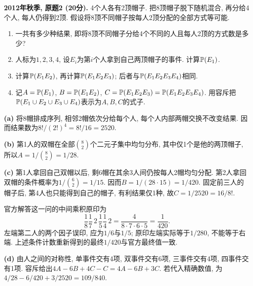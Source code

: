 \begin{exercise}\label{ex:m1-2012f-q2}
\textbf{2012年秋季, 原题2 (20分).} 4个人各有2顶帽子. 把8顶帽子脱下随机混合, 再分给4个人, 每人仍得到2顶. 假设将8顶不同帽子按每人2顶分配的全部方式等可能.
\begin{enumerate}
\item[(a)]\label{ex:m1-2012f-q2-a} 一共有多少种结果, 即将8顶不同帽子分给4个不同的人且每人2顶的方式数是多少?
\item[(b)]\label{ex:m1-2012f-q2-b} 人标为$1,2,3,4$, 设$E_i$为第$i$个人拿到自己两顶帽子的事件. 计算$\mathbb P(E_1)$.
\item[(c)]\label{ex:m1-2012f-q2-c} 计算$\mathbb P(E_1E_2)$, 再计算$\mathbb P(E_1E_2E_3)$; 后者与$\mathbb P(E_1E_2E_3E_4)$相同.
\item[(d)]\label{ex:m1-2012f-q2-d} 记$A=\mathbb P(E_1)$, $B=\mathbb P(E_1E_2)$, $C=\mathbb P(E_1E_2E_3)=\mathbb P(E_1E_2E_3E_4)$. 用容斥把$\mathbb P(E_1\cup E_2\cup E_3\cup E_4)$表示为$A,B,C$的式子.
\end{enumerate}
\end{exercise}
\begin{solution}
\textbf{(a)}\label{sol:m1-2012f-q2-a} 将8帽排成序列, 相邻2帽依次分给每个人, 每个人内部两帽交换不改变结果. 因而结果数为$8!/(2!)^4=8!/16=2520$.

\textbf{(b)}\label{sol:m1-2012f-q2-b} 第1人的双帽在全部$\binom82$个二元子集中均匀分布, 其中仅1个是他的两顶帽子, 所以$A=1/\binom82=1/28$.

\textbf{(c)}\label{sol:m1-2012f-q2-c} 第1人拿回自己双帽以后, 剩6帽在其余3人间仍按每人2帽均匀分配. 第2人拿回双帽的条件概率为$1/\binom62=1/15$. 因而$B=1/(28\cdot15)=1/420$. 固定前三人的帽子后, 第4人也只能得到自己的帽子, 有利结果仅1种, 故$C=1/2520=16/8!$.

官方解答这一问的中间乘积原印为
\[
\frac18\frac17\,2\,\frac15\frac14\,2
=\frac4{8\cdot7\cdot6\cdot5}=\frac1{420}.
\]
左端第二人的两个因子误印, 应为$1/6$与$1/5$; 原印左端实际等于$1/280$, 不能等于右端. 上述条件计数重新得到的最终$1/420$与官方最终值一致.

\textbf{(d)}\label{sol:m1-2012f-q2-d} 由人之间的对称性, 单事件交有4项, 双事件交有6项, 三事件交有4项, 四事件交有1项. 容斥给出$4A-6B+4C-C=4A-6B+3C$. 若代入精确数值, 为$4/28-6/420+3/2520=109/840$.
\end{solution}

